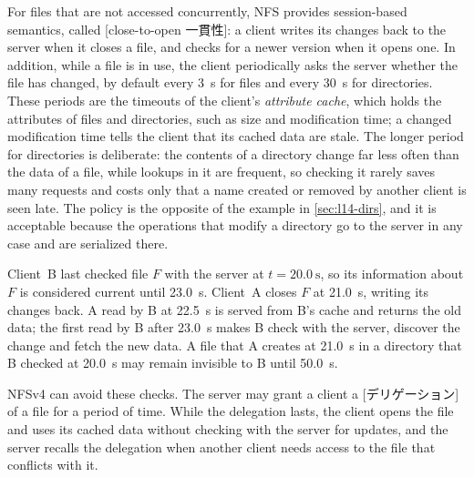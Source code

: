 \documentclass[../main.tex]{subfiles}
\begin{document}
For files that are not accessed concurrently, NFS provides session-based
semantics, called [close-to-open 一貫性]: a
client writes its changes back to the server when it closes a file, and
checks for a newer version when it opens one.  In addition,
while a file is in use, the client periodically asks the server whether the
file has changed, by default every \SI{3}{\second} for files and every
\SI{30}{\second} for directories.  These periods are the timeouts of the client's \emph{attribute
cache}, which holds the attributes of files and directories, such as size
and modification time; a changed modification time tells the client that
its cached data are stale.  The longer period
for directories is deliberate: the contents of a directory change far less
often than the data of a file, while lookups in it are frequent, so
checking it rarely saves many requests and costs only that a name created
or removed by another client is seen late.  The policy is the opposite of
the example in \cref{sec:l14-dirs}, and it is acceptable because the
operations that modify a directory go to the server in any case and are
serialized there.

\begin{example}
  Client~B last checked file $F$ with the server at
  $t=\SI{20.0}{\second}$, so its information about $F$ is considered
  current until \SI{23.0}{\second}.  Client~A closes $F$ at
  \SI{21.0}{\second}, writing its changes back.  A read by B at
  \SI{22.5}{\second} is served from B's cache and returns the old data; the
  first read by B after \SI{23.0}{\second} makes B check with the server,
  discover the change and fetch the new data.  A file that A creates at
  \SI{21.0}{\second} in a directory that B checked at \SI{20.0}{\second}
  may remain invisible to B until \SI{50.0}{\second}.
\end{example}

NFSv4 can avoid these checks.  The server may grant a client a
[デリゲーション] of a file for a period of time.  While the
delegation lasts, the client
opens the file and uses its cached data without checking with the server
for updates, and the server recalls the delegation when another client
needs access to the file that conflicts with it.
\end{document}
